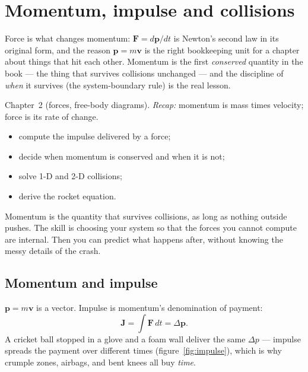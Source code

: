 \chapter{Momentum, impulse and collisions}\label{ch:momentum}

Force is what changes momentum: $\mathbf F=d\mathbf p/dt$ is Newton's
second law in its original form, and the reason $\mathbf p=m\mathbf v$ is
the right bookkeeping unit for a chapter about things that hit each other.
Momentum is the first \emph{conserved} quantity in the book --- the thing
that survives collisions unchanged --- and the discipline of \emph{when}
it survives (the system-boundary rule) is the real lesson.

\begin{rulebox}
Chapter~2 (forces, free-body diagrams). \emph{Recap:} momentum is mass times velocity; force is its rate of change.
\end{rulebox}
\begin{wins}
\begin{itemize}
\item compute the impulse delivered by a force;
\item decide when momentum is conserved and when it is not;
\item solve 1-D and 2-D collisions;
\item derive the rocket equation.
\end{itemize}
\end{wins}
\begin{principle}
Momentum is the quantity that survives collisions, as long as nothing outside pushes. The skill is choosing your system so that the forces you cannot compute are internal. Then you can predict what happens after, without knowing the messy details of the crash.
\end{principle}

\section{Momentum and impulse}\label{sec:mom-p}

$\mathbf p=m\mathbf v$ is a vector. Impulse is momentum's
denomination of payment:
\begin{equation}
  \mathbf J=\int\mathbf F\,dt=\Delta\mathbf p.\label{eq:impulse}
\end{equation}
A cricket ball stopped in a glove and a foam wall deliver the same $\Delta p$
--- impulse spreads the payment over different times (figure~\ref{fig:impulse}),
which is why crumple zones, airbags, and bent knees all buy
\emph{time}.

